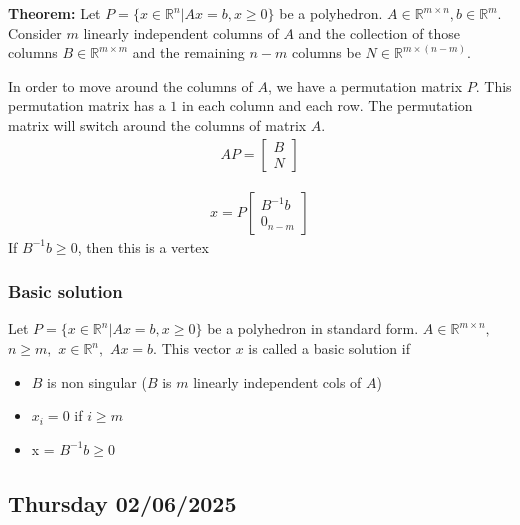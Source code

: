 \textbf{Theorem: } Let $P = \{ x \in \mathbb{R}^n | Ax = b, x \geq 0 \}$ be a polyhedron.
$A \in \mathbb{R}^{m \times n}, b \in \mathbb{R}^m$. 
Consider $m$ linearly independent columns of $A$ and the collection of those columns $B \in \mathbb{R}^{m \times m}$ and 
the remaining $n-m$ columns be $N \in \mathbb{R}^{m \times (n-m)}$. 

In order to move around the columns of $A$, we have a permutation matrix $P$.
This permutation matrix has a $1$ in each column and each row.
The permutation matrix will switch around the columns of matrix $A$.
\begin{align}
  AP = 
  \begin{bmatrix}
    B \\
    N
  \end{bmatrix}
\end{align}

\begin{align}
  x = P
  \begin{bmatrix}
     B^{-1} b \\
     0_{n-m}
  \end{bmatrix}
\end{align}
If $B^{-1} b \geq 0$, then this is a vertex
\subsubsection{Basic solution}
Let $P = \{ x \in \mathbb{R}^n | Ax = b, x \geq 0 \}$ be a polyhedron in standard form.
$A \in \mathbb{R}^{m \times n},$ 
$n \geq m,$
$x \in \mathbb{R}^n,$
$ Ax = b$.
This vector $x$ is called a basic solution if 
\begin{itemize}
  \item $B$ is non singular ($B$ is $m$ linearly independent cols of $A$)
  \item $x_i = 0$ if $i \geq m$
  \item x = $B^{-1} b \geq 0$
\end{itemize}

\subsection{Thursday 02/06/2025}
